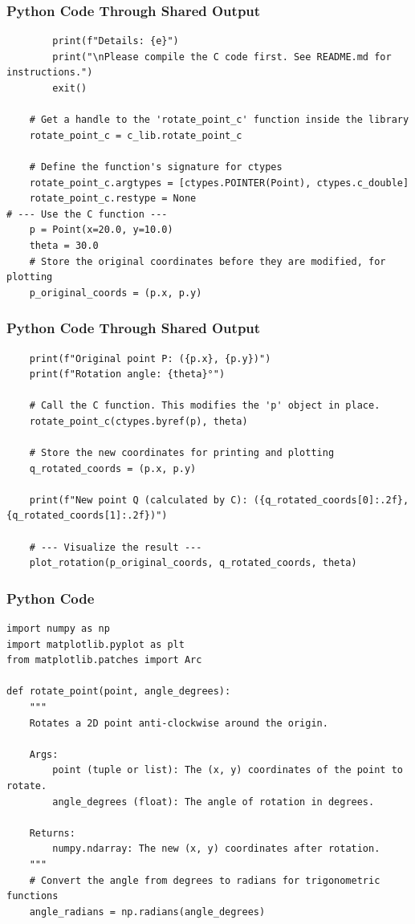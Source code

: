 \documentclass{beamer}
\begin{document}
\begin{frame}[fragile]
\frametitle{Python Code Through Shared Output}
\begin{lstlisting}
        print(f"Details: {e}")
        print("\nPlease compile the C code first. See README.md for instructions.")
        exit()

    # Get a handle to the 'rotate_point_c' function inside the library
    rotate_point_c = c_lib.rotate_point_c
    
    # Define the function's signature for ctypes
    rotate_point_c.argtypes = [ctypes.POINTER(Point), ctypes.c_double]
    rotate_point_c.restype = None
# --- Use the C function ---
    p = Point(x=20.0, y=10.0)
    theta = 30.0
    # Store the original coordinates before they are modified, for plotting
    p_original_coords = (p.x, p.y)
\end{lstlisting}
\end{frame}
\begin{frame}[fragile]
\frametitle{Python Code Through Shared Output}
\begin{lstlisting}
    print(f"Original point P: ({p.x}, {p.y})")
    print(f"Rotation angle: {theta}°")
    
    # Call the C function. This modifies the 'p' object in place.
    rotate_point_c(ctypes.byref(p), theta)

    # Store the new coordinates for printing and plotting
    q_rotated_coords = (p.x, p.y)

    print(f"New point Q (calculated by C): ({q_rotated_coords[0]:.2f}, {q_rotated_coords[1]:.2f})")

    # --- Visualize the result ---
    plot_rotation(p_original_coords, q_rotated_coords, theta)
    \end{lstlisting}
\end{frame}
\begin{frame}[fragile]
\frametitle{Python Code}
\begin{lstlisting}
import numpy as np
import matplotlib.pyplot as plt
from matplotlib.patches import Arc

def rotate_point(point, angle_degrees):
    """
    Rotates a 2D point anti-clockwise around the origin.

    Args:
        point (tuple or list): The (x, y) coordinates of the point to rotate.
        angle_degrees (float): The angle of rotation in degrees.

    Returns:
        numpy.ndarray: The new (x, y) coordinates after rotation.
    """
    # Convert the angle from degrees to radians for trigonometric functions
    angle_radians = np.radians(angle_degrees)
\end{lstlisting}
\end{frame}
\end{document}
